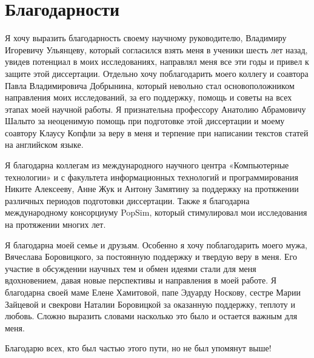 \chapter{Благодарности} \label{app2}
Я хочу выразить благодарность своему научному руководителю, Владимиру Игоревичу Ульянцеву, который согласился взять меня в ученики шесть лет назад, увидев потенциал в моих исследованиях, направлял меня все эти годы и привел к защите этой диссертации.
Отдельно хочу поблагодарить моего коллегу и соавтора Павла Владимировича Добрынина, который невольно стал основоположником направления моих исследований, за его поддержку, помощь и советы на всех этапах моей научной работы.
Я признательна профессору Анатолию Абрамовичу Шалыто за неоценимую помощь при подготовке этой диссертации и моему соавтору Клаусу Копфли за веру в меня и терпение при написании текстов статей на английском языке.

Я благодарна коллегам из международного научного центра «Компьютерные технологии» и с факультета информационных технологий и программирования Никите Алексееву, Анне Жук и Антону Замятину за поддержку на протяжении различных периодов подготовки диссертации.
Также я благодарна международному консорциуму PopSim, который стимулировал мои исследования на протяжении многих лет.

Я благодарна моей семье и друзьям.
Особенно я хочу поблагодарить моего мужа, Вячеслава Боровицкого, за постоянную поддержку и твердую веру в меня.
Его участие в обсуждении научных тем и обмен идеями стали для меня вдохновением, давая новые перспективы и направления в моей работе.
Я благодарна своей маме Елене Хамитовой, папе Эдуарду Носкову, сестре Марии Зайцевой и свекрови Наталии Боровицкой за оказанную поддержку, теплоту и любовь.
Сложно выразить словами насколько это было и остается важным для меня.

Благодарю всех, кто был частью этого пути, но не был упомянут выше!